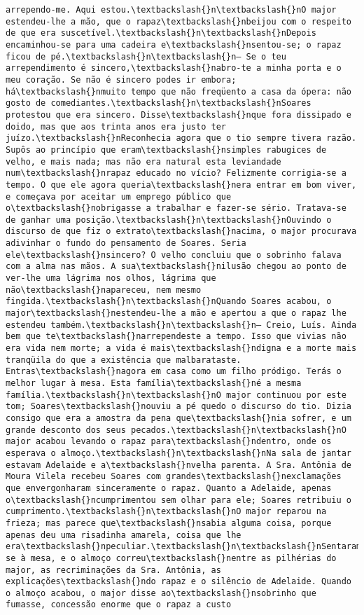 \begin{Verbatim}[commandchars=\\\{\}]
arrependo-me. Aqui estou.\textbackslash{}n\textbackslash{}nO major estendeu-lhe a mão, que o rapaz\textbackslash{}nbeijou com o respeito de que era suscetível.\textbackslash{}n\textbackslash{}nDepois encaminhou-se para uma cadeira e\textbackslash{}nsentou-se; o rapaz ficou de pé.\textbackslash{}n\textbackslash{}n— Se o teu arrependimento é sincero,\textbackslash{}nabro-te a minha porta e o meu coração. Se não é sincero podes ir embora; há\textbackslash{}nmuito tempo que não freqüento a casa da ópera: não gosto de comediantes.\textbackslash{}n\textbackslash{}nSoares protestou que era sincero. Disse\textbackslash{}nque fora dissipado e doido, mas que aos trinta anos era justo ter juízo.\textbackslash{}nReconhecia agora que o tio sempre tivera razão. Supôs ao princípio que eram\textbackslash{}nsimples rabugices de velho, e mais nada; mas não era natural esta leviandade num\textbackslash{}nrapaz educado no vício? Felizmente corrigia-se a tempo. O que ele agora queria\textbackslash{}nera entrar em bom viver, e começava por aceitar um emprego público que o\textbackslash{}nobrigasse a trabalhar e fazer-se sério. Tratava-se de ganhar uma posição.\textbackslash{}n\textbackslash{}nOuvindo o discurso de que fiz o extrato\textbackslash{}nacima, o major procurava adivinhar o fundo do pensamento de Soares. Seria ele\textbackslash{}nsincero? O velho concluiu que o sobrinho falava com a alma nas mãos. A sua\textbackslash{}nilusão chegou ao ponto de ver-lhe uma lágrima nos olhos, lágrima que não\textbackslash{}napareceu, nem mesmo fingida.\textbackslash{}n\textbackslash{}nQuando Soares acabou, o major\textbackslash{}nestendeu-lhe a mão e apertou a que o rapaz lhe estendeu também.\textbackslash{}n\textbackslash{}n— Creio, Luís. Ainda bem que te\textbackslash{}narrependeste a tempo. Isso que vivias não era vida nem morte; a vida é mais\textbackslash{}ndigna e a morte mais tranqüila do que a existência que malbarataste. Entras\textbackslash{}nagora em casa como um filho pródigo. Terás o melhor lugar à mesa. Esta família\textbackslash{}né a mesma família.\textbackslash{}n\textbackslash{}nO major continuou por este tom; Soares\textbackslash{}nouviu a pé quedo o discurso do tio. Dizia consigo que era a amostra da pena que\textbackslash{}nia sofrer, e um grande desconto dos seus pecados.\textbackslash{}n\textbackslash{}nO major acabou levando o rapaz para\textbackslash{}ndentro, onde os esperava o almoço.\textbackslash{}n\textbackslash{}nNa sala de jantar estavam Adelaide e a\textbackslash{}nvelha parenta. A Sra. Antônia de Moura Vilela recebeu Soares com grandes\textbackslash{}nexclamações que envergonharam sinceramente o rapaz. Quanto a Adelaide, apenas o\textbackslash{}ncumprimentou sem olhar para ele; Soares retribuiu o cumprimento.\textbackslash{}n\textbackslash{}nO major reparou na frieza; mas parece que\textbackslash{}nsabia alguma coisa, porque apenas deu uma risadinha amarela, coisa que lhe era\textbackslash{}npeculiar.\textbackslash{}n\textbackslash{}nSentaram-se à mesa, e o almoço correu\textbackslash{}nentre as pilhérias do major, as recriminações da Sra. Antônia, as explicações\textbackslash{}ndo rapaz e o silêncio de Adelaide. Quando o almoço acabou, o major disse ao\textbackslash{}nsobrinho que fumasse, concessão enorme que o rapaz a custo 
\end{Verbatim}
